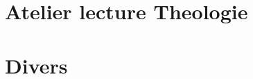 \documentclass[oneside,10pt]{book}
\begin{document}
 
 
  \part{Atelier lecture Theologie}
 
 
  
  
    
  
 
 \part{Divers}




 


%

\printbibliography

%
\end{document}
